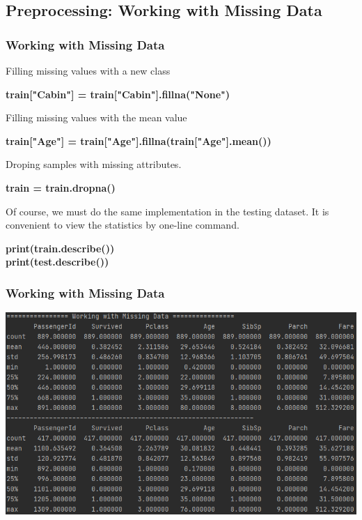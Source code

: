 \documentclass{beamer}
\begin{document}
\subsection{Preprocessing: Working with Missing Data}
\begin{frame}
	\frametitle{Working with Missing Data}
	\begin{flushleft}
		Filling missing values with a new class
	\end{flushleft}
	\begin{center}
		\textbf{\color{blue}train["Cabin"] = train["Cabin"].fillna("None")}
	\end{center}
	\begin{flushleft}
		Filling missing values with the mean value
	\end{flushleft}
	\begin{center}
		\textbf{\color{blue}train["Age"] = train["Age"].fillna(train["Age"].mean())}
	\end{center}
	\begin{flushleft}
		Droping samples with missing attributes.
	\end{flushleft}
	\begin{center}
		\textbf{\color{blue}train = train.dropna()}
	\end{center}
	\begin{flushleft}
		Of course, we must do the same implementation in the testing dataset. It is convenient to view the statistics by one-line command.
	\end{flushleft}
	\begin{center}
		\textbf{\color{blue}print(train.describe()) \\ print(test.describe())}
	\end{center}
\end{frame}

\begin{frame}
	\frametitle{Working with Missing Data}
	\begin{center}
		\includegraphics[width=0.9\linewidth]{./src/figures/2.png}
	\end{center}
\end{frame}
\end{document}
